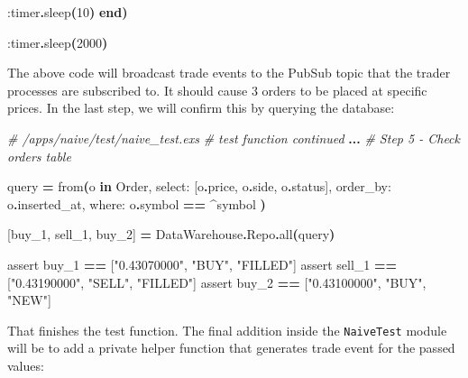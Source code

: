 \documentclass[
  oneside]{book}
\newenvironment{Shaded}{\begin{snugshade}}{\end{snugshade}}
\newcommand{\CommentTok}[1]{\textcolor[rgb]{0.56,0.35,0.01}{\textit{#1}}}
\newcommand{\ConstantTok}[1]{\textcolor[rgb]{0.56,0.35,0.01}{#1}}
\newcommand{\DecValTok}[1]{\textcolor[rgb]{0.00,0.00,0.81}{#1}}
\newcommand{\FunctionTok}[1]{\textcolor[rgb]{0.13,0.29,0.53}{\textbf{#1}}}
\newcommand{\KeywordTok}[1]{\textcolor[rgb]{0.13,0.29,0.53}{\textbf{#1}}}
\newcommand{\NormalTok}[1]{#1}
\newcommand{\OperatorTok}[1]{\textcolor[rgb]{0.81,0.36,0.00}{\textbf{#1}}}
\newcommand{\OtherTok}[1]{\textcolor[rgb]{0.56,0.35,0.01}{#1}}
\newcommand{\StringTok}[1]{\textcolor[rgb]{0.31,0.60,0.02}{#1}}
\newcommand{\VariableTok}[1]{\textcolor[rgb]{0.00,0.00,0.00}{#1}}
\begin{document}
\begin{Shaded}
\begin{Highlighting}[]
      \VariableTok{:timer}\OperatorTok{.}\NormalTok{sleep}\FunctionTok{(}\DecValTok{10}\FunctionTok{)}
    \KeywordTok{end}\FunctionTok{)}

    \VariableTok{:timer}\OperatorTok{.}\NormalTok{sleep}\FunctionTok{(}\DecValTok{2000}\FunctionTok{)}
\end{Highlighting}
\end{Shaded}

The above code will broadcast trade events to the PubSub topic that the trader processes are subscribed to.
It should cause 3 orders to be placed at specific prices. In the last step, we will confirm this by querying the database:

\begin{Shaded}
\begin{Highlighting}[]
    \CommentTok{\# /apps/naive/test/naive\_test.exs}
    \CommentTok{\# \textasciigrave{}test\textasciigrave{} function continued}
    \OperatorTok{...}
    \CommentTok{\# Step 5 {-} Check orders table}

\NormalTok{    query }\OperatorTok{=}
\NormalTok{      from}\FunctionTok{(}\NormalTok{o }\KeywordTok{in} \ConstantTok{Order}\NormalTok{,}
        \VariableTok{select:} \OtherTok{[}\NormalTok{o}\OperatorTok{.}\NormalTok{price, o}\OperatorTok{.}\NormalTok{side, o}\OperatorTok{.}\NormalTok{status}\OtherTok{]}\NormalTok{,}
        \VariableTok{order\_by:}\NormalTok{ o}\OperatorTok{.}\NormalTok{inserted\_at,}
        \VariableTok{where:}\NormalTok{ o}\OperatorTok{.}\NormalTok{symbol }\OperatorTok{==} \OperatorTok{\^{}}\NormalTok{symbol}
      \FunctionTok{)}

    \OtherTok{[}\NormalTok{buy\_1, sell\_1, buy\_2}\OtherTok{]} \OperatorTok{=} \ConstantTok{DataWarehouse}\OperatorTok{.}\ConstantTok{Repo}\OperatorTok{.}\NormalTok{all}\FunctionTok{(}\NormalTok{query}\FunctionTok{)}

\NormalTok{    assert buy\_1 }\OperatorTok{==} \OtherTok{[}\StringTok{"0.43070000"}\NormalTok{, }\StringTok{"BUY"}\NormalTok{, }\StringTok{"FILLED"}\OtherTok{]}
\NormalTok{    assert sell\_1 }\OperatorTok{==} \OtherTok{[}\StringTok{"0.43190000"}\NormalTok{, }\StringTok{"SELL"}\NormalTok{, }\StringTok{"FILLED"}\OtherTok{]}
\NormalTok{    assert buy\_2 }\OperatorTok{==} \OtherTok{[}\StringTok{"0.43100000"}\NormalTok{, }\StringTok{"BUY"}\NormalTok{, }\StringTok{"NEW"}\OtherTok{]}
\end{Highlighting}
\end{Shaded}

That finishes the test function. The final addition inside the \texttt{NaiveTest} module will be to add a private helper function that generates trade event for the passed values:
\end{document}
